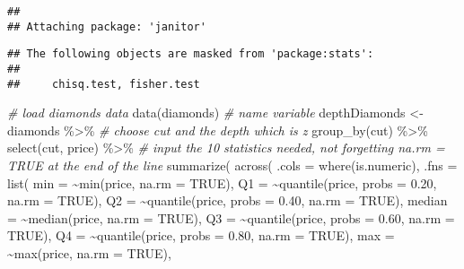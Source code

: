\documentclass[
]{article}
\newenvironment{Shaded}{\begin{snugshade}}{\end{snugshade}}
\newcommand{\AttributeTok}[1]{\textcolor[rgb]{0.77,0.63,0.00}{#1}}
\newcommand{\CommentTok}[1]{\textcolor[rgb]{0.56,0.35,0.01}{\textit{#1}}}
\newcommand{\ConstantTok}[1]{\textcolor[rgb]{0.00,0.00,0.00}{#1}}
\newcommand{\FloatTok}[1]{\textcolor[rgb]{0.00,0.00,0.81}{#1}}
\newcommand{\FunctionTok}[1]{\textcolor[rgb]{0.00,0.00,0.00}{#1}}
\newcommand{\NormalTok}[1]{#1}
\newcommand{\OtherTok}[1]{\textcolor[rgb]{0.56,0.35,0.01}{#1}}
\newcommand{\SpecialCharTok}[1]{\textcolor[rgb]{0.00,0.00,0.00}{#1}}
\begin{document}
\begin{verbatim}
## 
## Attaching package: 'janitor'
\end{verbatim}

\begin{verbatim}
## The following objects are masked from 'package:stats':
## 
##     chisq.test, fisher.test
\end{verbatim}

\begin{Shaded}
\begin{Highlighting}[]
\CommentTok{\# load diamonds data}
\FunctionTok{data}\NormalTok{(diamonds)}
\CommentTok{\# name variable}
\NormalTok{depthDiamonds }\OtherTok{\textless{}{-}}\NormalTok{ diamonds }\SpecialCharTok{\%\textgreater{}\%}
  \CommentTok{\# choose cut and the depth which is z}
  \FunctionTok{group\_by}\NormalTok{(cut) }\SpecialCharTok{\%\textgreater{}\%}
  \FunctionTok{select}\NormalTok{(cut, price) }\SpecialCharTok{\%\textgreater{}\%}
  \CommentTok{\# input the 10 statistics needed, not forgetting na.rm = TRUE at the end of the line}
  \FunctionTok{summarize}\NormalTok{(}
    \FunctionTok{across}\NormalTok{(}
      \AttributeTok{.cols =} \FunctionTok{where}\NormalTok{(is.numeric),}
      \AttributeTok{.fns =} \FunctionTok{list}\NormalTok{(}
        \AttributeTok{min =} \SpecialCharTok{\textasciitilde{}}\FunctionTok{min}\NormalTok{(price, }\AttributeTok{na.rm =} \ConstantTok{TRUE}\NormalTok{),}
        \AttributeTok{Q1 =} \SpecialCharTok{\textasciitilde{}}\FunctionTok{quantile}\NormalTok{(price, }\AttributeTok{probs =} \FloatTok{0.20}\NormalTok{, }\AttributeTok{na.rm =} \ConstantTok{TRUE}\NormalTok{),}
        \AttributeTok{Q2 =} \SpecialCharTok{\textasciitilde{}}\FunctionTok{quantile}\NormalTok{(price, }\AttributeTok{probs =} \FloatTok{0.40}\NormalTok{, }\AttributeTok{na.rm =} \ConstantTok{TRUE}\NormalTok{),}
        \AttributeTok{median =} \SpecialCharTok{\textasciitilde{}}\FunctionTok{median}\NormalTok{(price, }\AttributeTok{na.rm =} \ConstantTok{TRUE}\NormalTok{),}
        \AttributeTok{Q3 =} \SpecialCharTok{\textasciitilde{}}\FunctionTok{quantile}\NormalTok{(price, }\AttributeTok{probs =} \FloatTok{0.60}\NormalTok{, }\AttributeTok{na.rm =} \ConstantTok{TRUE}\NormalTok{),}
        \AttributeTok{Q4 =} \SpecialCharTok{\textasciitilde{}}\FunctionTok{quantile}\NormalTok{(price, }\AttributeTok{probs =} \FloatTok{0.80}\NormalTok{, }\AttributeTok{na.rm =} \ConstantTok{TRUE}\NormalTok{),}
        \AttributeTok{max =} \SpecialCharTok{\textasciitilde{}}\FunctionTok{max}\NormalTok{(price, }\AttributeTok{na.rm =} \ConstantTok{TRUE}\NormalTok{),}

\end{Highlighting}
\end{Shaded}
\end{document}
